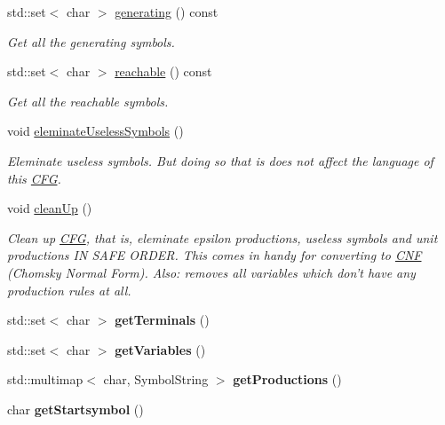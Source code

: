 \begin{DoxyCompactItemize}
std\-::set$<$ char $>$ \hyperlink{class_c_f_g_ac6b8b908c8af9211ebecab911d5cd5ea}{generating} () const 
\begin{DoxyCompactList}\small\item\em Get all the generating symbols. \end{DoxyCompactList}\item 
std\-::set$<$ char $>$ \hyperlink{class_c_f_g_a41fd806703a8f2187abbefaa72a5cb5c}{reachable} () const 
\begin{DoxyCompactList}\small\item\em Get all the reachable symbols. \end{DoxyCompactList}\item 
void \hyperlink{class_c_f_g_a08b46d11fa9ce0670c1218d5231c20cb}{eleminate\-Useless\-Symbols} ()
\begin{DoxyCompactList}\small\item\em Eleminate useless symbols. But doing so that is does not affect the language of this \hyperlink{class_c_f_g}{C\-F\-G}. \end{DoxyCompactList}\item 
void \hyperlink{class_c_f_g_ab9999f6e214b05d9dfb0536b8b680e10}{clean\-Up} ()
\begin{DoxyCompactList}\small\item\em Clean up \hyperlink{class_c_f_g}{C\-F\-G}, that is, eleminate epsilon productions, useless symbols and unit productions I\-N S\-A\-F\-E O\-R\-D\-E\-R. This comes in handy for converting to \hyperlink{class_c_n_f}{C\-N\-F} (Chomsky Normal Form). Also\-: removes all variables which don't have any production rules at all. \end{DoxyCompactList}\item 
\hypertarget{class_c_f_g_a49b4255577be81ace0b957bd05ffcc4e}{std\-::set$<$ char $>$ {\bfseries get\-Terminals} ()}\label{class_c_f_g_a49b4255577be81ace0b957bd05ffcc4e}

\item 
\hypertarget{class_c_f_g_a93e29d2502f3189e7f7a9808d3871537}{std\-::set$<$ char $>$ {\bfseries get\-Variables} ()}\label{class_c_f_g_a93e29d2502f3189e7f7a9808d3871537}

\item 
\hypertarget{class_c_f_g_aa3831e04435bec5137fbf8ec99342d53}{std\-::multimap$<$ char, Symbol\-String $>$ {\bfseries get\-Productions} ()}\label{class_c_f_g_aa3831e04435bec5137fbf8ec99342d53}

\item 
\hypertarget{class_c_f_g_a7f285339723a8cbe79dcf3fc4eb1c551}{char {\bfseries get\-Startsymbol} ()}\label{class_c_f_g_a7f285339723a8cbe79dcf3fc4eb1c551}

\end{DoxyCompactItemize}
